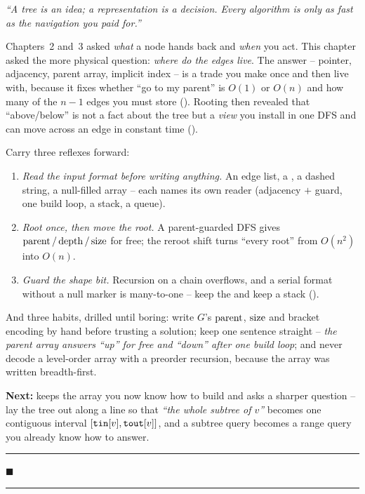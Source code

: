 \begin{lastword}
\emph{``A tree is an idea; a representation is a decision. Every algorithm is only as fast
as the navigation you paid for.''}

\medskip
Chapters~2 and~3 asked \emph{what} a node hands back and \emph{when} you act. This chapter
asked the more physical question: \emph{where do the edges live}. The answer -- pointer,
adjacency, parent array, implicit index -- is a trade you make once and then live with,
because it fixes whether ``go to my parent'' is $O(1)$ or $O(n)$ and how many of the
$n-1$ edges you must store (). Rooting then revealed that ``above/below''
is not a fact about the tree but a \emph{view} you install in one DFS and can move across an
edge in constant time ().

\medskip
Carry three reflexes forward:
\begin{enumerate}[nosep, leftmargin=1.6em]
  \item \emph{Read the input format before writing anything.} An edge list, a
        , a dashed string, a null-filled array -- each names its own reader
        (adjacency $+$ guard, one build loop, a stack, a queue).
  \item \emph{Root once, then move the root.} A parent-guarded DFS gives $\operatorname{parent}/\operatorname{depth}/\operatorname{size}$
        for free; the reroot shift turns ``every root'' from $O(n^2)$ into $O(n)$.
  \item \emph{Guard the shape bit.} Recursion on a chain overflows, and a serial format
        without a null marker is many-to-one -- keep the \code{()} and keep a stack
        ().
\end{enumerate}

\medskip
And three habits, drilled until boring: write $G$'s $\operatorname{parent}$, $\operatorname{size}$ and bracket encoding
by hand before trusting a solution; keep one sentence straight -- \emph{the parent array
answers ``up'' for free and ``down'' after one build loop}; and never decode a level-order
array with a preorder recursion, because the array was written breadth-first.

\medskip
\textbf{Next:}  keeps the array you now know how to build and asks a sharper
question -- lay the tree out along a line so that \emph{``the whole subtree of $v$''}
becomes one contiguous interval $[\texttt{tin}[v],\texttt{tout}[v]]$, and a subtree query
becomes a range query you already know how to answer.

\begin{center}\textcolor{softpurple}{\rule{0.4\linewidth}{0.6pt}\quad $\blacksquare$\quad \rule{0.4\linewidth}{0.6pt}}\end{center}
\end{lastword}
